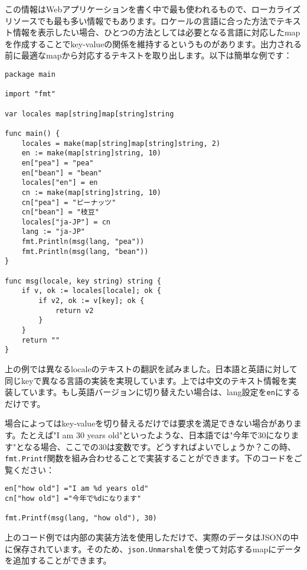 この情報はWebアプリケーションを書く中で最も使われるもので、ローカライズリソースでも最も多い情報でもあります。ロケールの言語に合った方法でテキスト情報を表示したい場合、ひとつの方法としては必要となる言語に対応したmapを作成することでkey-valueの関係を維持するというものがあります。出力される前に最適なmapから対応するテキストを取り出します。以下は簡単な例です：

\begin{lstlisting}[numbers=none]
package main

import "fmt"

var locales map[string]map[string]string

func main() {
    locales = make(map[string]map[string]string, 2)
    en := make(map[string]string, 10)
    en["pea"] = "pea"
    en["bean"] = "bean"
    locales["en"] = en
    cn := make(map[string]string, 10)
    cn["pea"] = "ピーナッツ"
    cn["bean"] = "枝豆"
    locales["ja-JP"] = cn
    lang := "ja-JP"
    fmt.Println(msg(lang, "pea"))
    fmt.Println(msg(lang, "bean"))
}

func msg(locale, key string) string {
    if v, ok := locales[locale]; ok {
        if v2, ok := v[key]; ok {
            return v2
        }
    }
    return ""
}
\end{lstlisting}

上の例では異なるlocaleのテキストの翻訳を試みました。日本語と英語に対して同じkeyで異なる言語の実装を実現しています。上では中文のテキスト情報を実装しています。もし英語バージョンに切り替えたい場合は、lang設定を\texttt{en}にするだけです。

場合によってはkey-valueを切り替えるだけでは要求を満足できない場合があります。たとえば"I am 30 years old"といったような、日本語では"今年で30になります"となる場合、ここでの30は変数です。どうすればよいでしょうか？この時、\texttt{fmt.Printf}関数を組み合わせることで実装することができます。下のコードをご覧ください：


\begin{lstlisting}[numbers=none]
en["how old"] ="I am %d years old"
cn["how old"] ="今年で%dになります"

fmt.Printf(msg(lang, "how old"), 30)
\end{lstlisting}

上のコード例では内部の実装方法を使用しただけで、実際のデータはJSONの中に保存されています。そのため、\texttt{json.Unmarshal}を使って対応するmapにデータを追加することができます。

